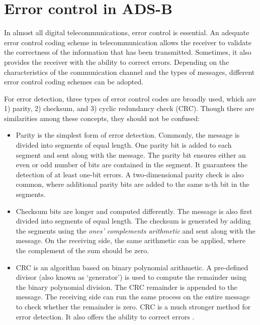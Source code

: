 \chapter{Error control in ADS-B} \label{chap:adsb_parity}

In almost all digital telecommunications, error control is essential. An adequate error control coding scheme in telecommunication allows the receiver to validate the correctness of the information that has been transmitted. Sometimes, it also provides the receiver with the ability to correct errors. Depending on the characteristics of the communication channel and the types of messages, different error control coding schemes can be adopted.

For error detection, three types of error control codes are broadly used, which are 1) parity, 2) checksum, and 3) cyclic redundancy check (CRC)\cite{grami2015}. Though there are similarities among these concepts, they should not be confused:

\begin{itemize}

 \item Parity is the simplest form of error detection. Commonly, the message is divided into segments of equal length. One parity bit is added to each segment and sent along with the message. The parity bit ensures either an even or odd number of \1 bits are contained in the segment. It guarantees the detection of at least one-bit errors. A two-dimensional parity check is also common, where additional parity bits are added to the same n-th bit in the segments.

 \item Checksum bits are longer and computed differently. The message is also first divided into segments of equal length. The checksum is generated by adding the segments using the \emph{ones' complements arithmetic} and sent along with the message. On the receiving side, the same arithmetic can be applied, where the complement of the sum should be zero.

 \item CRC is an algorithm based on binary polynomial arithmetic. A pre-defined divisor (also known as `generator') is used to compute the remainder using the binary polynomial division. The CRC remainder is appended to the message. The receiving side can run the same process on the entire message to check whether the remainder is zero. CRC is a much stronger method for error detection. It also offers the ability to correct errors \cite{mandel2009}.

\end{itemize}


